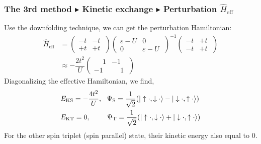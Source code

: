 \documentclass{beamer}
\begin{document}
  \begin{frame}
    \frametitle{The 3rd method \(\blacktriangleright\) Kinetic exchange \(\blacktriangleright\) Perturbation \(\widehat{H}_{\text{eff}}\)}
     Use the downfolding technique, we can get the perturbation Hamiltonian:
     \begin{equation}
      \begin{aligned}
        \widehat{H}_{\text{eff}} &= \begin{pmatrix}
          -t & -t \;\\
          +t & +t \;
        \end{pmatrix} \begin{pmatrix}
         \varepsilon-U & 0 \;\\
         0 & \varepsilon-U \;
        \end{pmatrix}^{-1} \begin{pmatrix}
         -t & +t \;\\
         -t & +t \;
        \end{pmatrix}\\
        &\approx -\dfrac{2t^2}{U}\begin{pmatrix}
          \phantom{+}1 & -1 \;\\
          -1 & \phantom{+}1 \;
        \end{pmatrix}
      \end{aligned}
     \end{equation}
     Diagonalizing the effective Hamiltonian, we find,
     \begin{subequations}
      \begin{align}
        &E_{\text{KS}} = -\dfrac{4t^2}{U},\ \ \Psi_{\text{S}} =  \frac{1}{\sqrt{2}}(|\uparrow\cdot,\downarrow\cdot\rangle - |\downarrow\cdot,\uparrow\cdot\rangle)\\
        &E_{\text{KT}} = 0, \hspace{2.4em}\Psi_{\text{T}} =  \frac{1}{\sqrt{2}}(|\uparrow\cdot,\downarrow\cdot\rangle + |\downarrow\cdot,\uparrow\cdot\rangle)
      \end{align}
     \end{subequations}
     For the other spin triplet (spin parallel) state, their kinetic energy also equal to \(0\).
  \end{frame}
\end{document}

